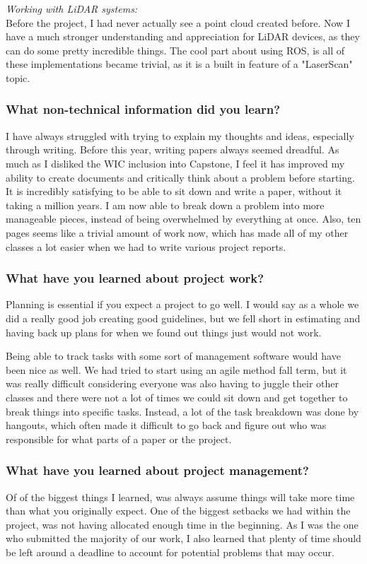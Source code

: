 \documentclass[compsoc,draftclsnofoot,onecolumn,10pt]{IEEEtran}
\begin{document}
\textit{Working with LiDAR systems:\\}
Before the project, I had never actually see a point cloud created before. Now I have a much stronger understanding and appreciation for LiDAR devices, as they can do some pretty incredible things. The cool part about using ROS, is all of these implementations became trivial, as it is a built in feature of a "LaserScan" topic.    

\subsubsection*{What non-technical information did you learn?}
I have always struggled with trying to explain my thoughts and ideas, especially through writing. 
Before this year, writing papers always seemed dreadful. 
As much as I disliked the WIC inclusion into Capstone, I feel it has improved my ability to create documents and critically think about a problem before starting.
It is incredibly satisfying to be able to sit down and write a paper, without it taking a million years.
I am now able to break down a problem into more manageable pieces, instead of being overwhelmed by everything at once. 
Also, ten pages seems like a trivial amount of work now, which has made all of my other classes a lot easier when we had to write various project reports. \par


\subsubsection*{What have you learned about project work?}
Planning is essential if you expect a project to go well. I would say as a whole we did a really good job creating good guidelines, but we fell short in estimating and having back up plans for when we found out things just would not work. 

Being able to track tasks with some sort of management software would have been nice as well. We had tried to start using an agile method fall term, but it was really difficult considering everyone was also having to juggle their other classes and there were not a lot of times we could sit down and get together to break things into specific tasks. Instead, a lot of the task breakdown was done by hangouts, which often made it difficult to go back and figure out who was responsible for what parts of a paper or the project. 

\subsubsection*{What have you learned about project management?}
Of of the biggest things I learned, was always assume things will take more time than what you originally expect. One of the biggest setbacks we had within the project, was not having allocated enough time in the beginning. As I was the one who submitted the majority of our work, I also learned that plenty of time should be left around a deadline to account for potential problems that may occur. 
\end{document}
